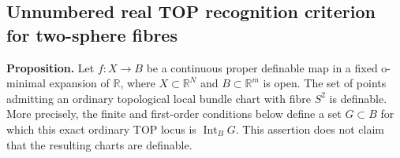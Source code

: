 \subsection*{Unnumbered real TOP recognition criterion for two-sphere fibres}

\textbf{Proposition.}\quad
Let $f:X\to B$ be a continuous proper definable map in a fixed
 o-minimal expansion of $\mathbb R$, where $X\subset\mathbb R^N$
 and $B\subset\mathbb R^m$ is open. The set of points admitting an
 ordinary topological local bundle chart with fibre $S^2$ is definable.
 More precisely, the finite and first-order conditions below define a
 set $G\subset B$ for which this exact ordinary TOP locus is
 $\operatorname{Int}_B G$.
 This assertion does not claim that the resulting charts are definable.

